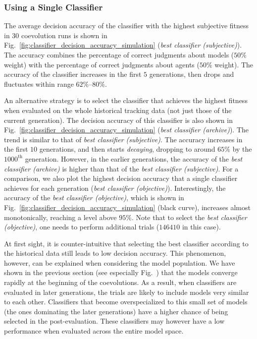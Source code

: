 \subsubsection{Using a Single Classifier}

The average decision accuracy of the classifier with the highest subjective fitness in $30$ coevolution runs is shown in Fig.~\ref{fig:classifier_decision_accuracy_simulation} (\textit{best classifier (subjective)}). The accuracy combines the percentage of correct judgments about models ($50\%$ weight) with the percentage of correct judgments about agents ($50\%$ weight). The accuracy of the classifier increases in the first $5$ generations, then drops and fluctuates within range $62\%$--$80\%$.

An alternative strategy is to select the classifier that achieves the highest fitness when evaluated on the whole historical tracking data (not just those of the current generation). The decision accuracy of this classifier is also shown in Fig.~\ref{fig:classifier_decision_accuracy_simulation} (\textit{best classifier (archive)}). The trend is similar to that of \textit{best classifier (subjective)}. The accuracy increases in the first $10$ generations,  and then starts \emph{decaying}, dropping to around $65\%$ by the $1000^\textrm{th}$ generation. However, in the earlier generations, the accuracy of the \textit{best classifier (archive)} is higher than that of the \textit{best classifier (subjective)}. For a comparison, we also plot the highest decision accuracy that a single classifier achieves for each generation (\textit{best classifier (objective)}). Interestingly, the accuracy of the \textit{best classifier (objective)}, which is shown in  Fig.~\ref{fig:classifier_decision_accuracy_simulation} (black curve), increases almost monotonically, reaching a level above $95\%$. Note that to select the \textit{best classifier (objective)}, one needs to perform additional trials ($146410$ in this case).

At first sight, it is counter-intuitive that selecting the best classifier according to the historical data still leads to low decision accuracy. This phenomenon, however, can be explained when considering the model population. We have shown in the previous section (see especially Fig.~) that the models converge rapidly at the beginning of the coevolutions. As a result, when classifiers are evaluated in later generations, the trials are likely to include models very similar to each other. Classifiers that become overspecialized to this small set of models (the ones dominating the later generations) have a higher chance of being selected in the post-evaluation. These classifiers may however have a low performance when evaluated across the entire model space.

